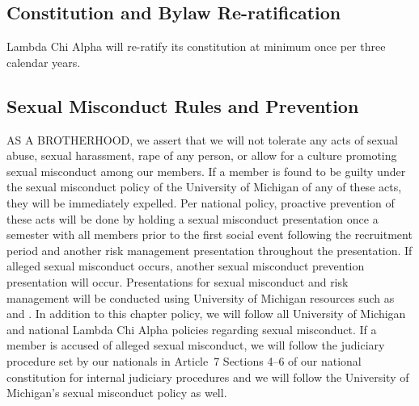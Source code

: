 \documentclass{article}
\begin{document}
\subsection{Constitution and Bylaw Re-ratification}

Lambda Chi Alpha will re-ratify its constitution at minimum once per three
calendar years.

\subsection{Sexual Misconduct Rules and Prevention}

AS A BROTHERHOOD, we assert that we will not tolerate any acts of sexual abuse,
sexual harassment, rape of any person, or allow for a culture promoting sexual
misconduct among our members. If a member is found to be guilty under the sexual
misconduct policy of the University of Michigan of any of these acts, they will
be immediately expelled. Per national policy, proactive prevention of these acts
will be done by holding a sexual misconduct presentation once a semester with
all members prior to the first social event following the recruitment period and
another risk management presentation throughout the presentation. If alleged
sexual misconduct occurs, another sexual misconduct prevention presentation will
occur. Presentations for sexual misconduct and risk management will be conducted
using University of Michigan resources such as  and
. In addition to this chapter policy, we will follow all
University of Michigan and national Lambda Chi Alpha policies regarding sexual
misconduct. If a member is accused of alleged sexual misconduct, we will follow
the judiciary procedure set by our nationals in Article~7 Sections 4–6 of our
national constitution for internal judiciary procedures and we will follow the
University of Michigan’s sexual misconduct policy as well.
\end{document}
